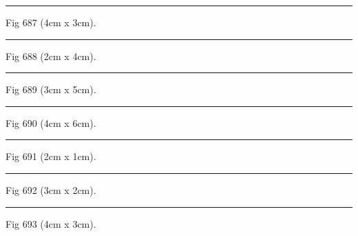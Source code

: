 \documentclass[a4paper,11pt]{article}
\begin{document}
\begin{swarmwrap}%
  \begin{minipage}[t]{4cm}
    \centering
    \rule{\linewidth}{3cm}
    {\footnotesize Fig 687 (4cm x 3cm).}
  \end{minipage}%
\end{swarmwrap}%
\swarmwrapnext
\lipsum[87]%

\begin{swarmwrap}%
  \begin{minipage}[t]{2cm}
    \centering
    \rule{\linewidth}{4cm}
    {\footnotesize Fig 688 (2cm x 4cm).}
  \end{minipage}%
\end{swarmwrap}%
\swarmwrapnext
\lipsum[88]%

\begin{swarmwrap}%
  \begin{minipage}[t]{3cm}
    \centering
    \rule{\linewidth}{5cm}
    {\footnotesize Fig 689 (3cm x 5cm).}
  \end{minipage}%
\end{swarmwrap}%
\swarmwrapnext
\lipsum[89]%

\begin{swarmwrap}%
  \begin{minipage}[t]{4cm}
    \centering
    \rule{\linewidth}{6cm}
    {\footnotesize Fig 690 (4cm x 6cm).}
  \end{minipage}%
\end{swarmwrap}%
\swarmwrapnext
\lipsum[90]%

\begin{swarmwrap}%
  \begin{minipage}[t]{2cm}
    \centering
    \rule{\linewidth}{1cm}
    {\footnotesize Fig 691 (2cm x 1cm).}
  \end{minipage}%
\end{swarmwrap}%
\swarmwrapnext
\lipsum[91]%

\begin{swarmwrap}%
  \begin{minipage}[t]{3cm}
    \centering
    \rule{\linewidth}{2cm}
    {\footnotesize Fig 692 (3cm x 2cm).}
  \end{minipage}%
\end{swarmwrap}%
\swarmwrapnext
\lipsum[92]%

\begin{swarmwrap}%
  \begin{minipage}[t]{4cm}
    \centering
    \rule{\linewidth}{3cm}
    {\footnotesize Fig 693 (4cm x 3cm).}
  \end{minipage}%
\end{swarmwrap}%
\swarmwrapnext
\lipsum[93]%
\end{document}
